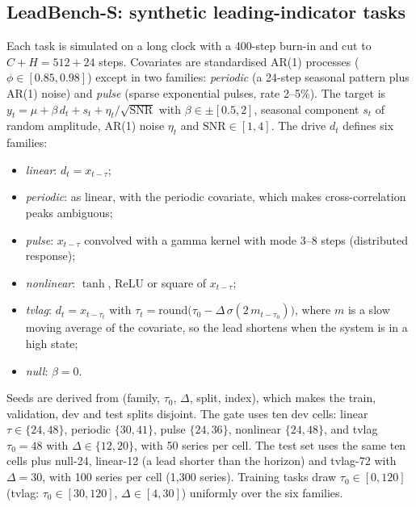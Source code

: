 \documentclass[preprint,11pt,authoryear]{elsarticle}
\begin{document}
\subsection{LeadBench-S: synthetic leading-indicator tasks}
Each task is simulated on a long clock with a 400-step burn-in and cut to $C+H=512+24$ steps. Covariates are standardised AR(1) processes ($\phi\in[0.85,0.98]$) except in two families: \emph{periodic} (a 24-step seasonal pattern plus AR(1) noise) and \emph{pulse} (sparse exponential pulses, rate 2--5\%). The target is $y_t=\mu+\beta\, d_t+s_t+\eta_t/\sqrt{\mathrm{SNR}}$ with $\beta\in\pm[0.5,2]$, seasonal component $s_t$ of random amplitude, AR(1) noise $\eta_t$ and $\mathrm{SNR}\in[1,4]$. The drive $d_t$ defines six families:
\begin{itemize}
\item \emph{linear}: $d_t=x_{t-\tau}$;
\item \emph{periodic}: as linear, with the periodic covariate, which makes cross-correlation peaks ambiguous;
\item \emph{pulse}: $x_{t-\tau}$ convolved with a gamma kernel with mode 3--8 steps (distributed response);
\item \emph{nonlinear}: $\tanh$, ReLU or square of $x_{t-\tau}$;
\item \emph{tvlag}: $d_t=x_{t-\tau_t}$ with $\tau_t=\mathrm{round}\bigl(\tau_0-\Delta\,\sigma(2\,m_{t-\tau_0})\bigr)$, where $m$ is a slow moving average of the covariate, so the lead shortens when the system is in a high state;
\item \emph{null}: $\beta=0$.
\end{itemize}
Seeds are derived from (family, $\tau_0$, $\Delta$, split, index), which makes the train, validation, dev and test splits disjoint. The gate uses ten dev cells: linear $\tau\in\{24,48\}$, periodic $\{30,41\}$, pulse $\{24,36\}$, nonlinear $\{24,48\}$, and tvlag $\tau_0=48$ with $\Delta\in\{12,20\}$, with 50 series per cell. The test set uses the same ten cells plus null-24, linear-12 (a lead shorter than the horizon) and tvlag-72 with $\Delta=30$, with 100 series per cell (1,300 series). Training tasks draw $\tau_0\in[0,120]$ (tvlag: $\tau_0\in[30,120]$, $\Delta\in[4,30]$) uniformly over the six families.
\end{document}
